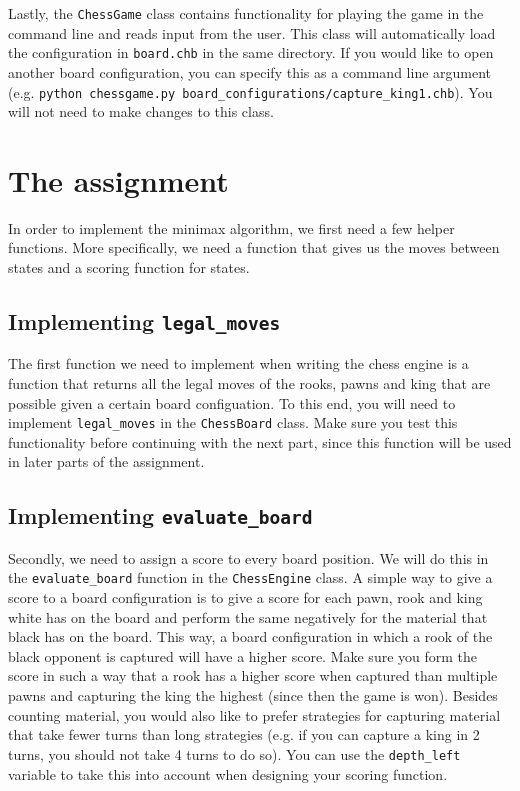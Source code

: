 \documentclass{article}
\begin{document}
Lastly, the \texttt{ChessGame} class contains functionality for playing the game in the command line and reads input from the user. This class will automatically load the configuration in \texttt{board.chb} in the same directory. If you would like to open another board configuration, you can specify this as a command line argument (e.g. \texttt{python chessgame.py board\_configurations/capture\_king1.chb}). You will not need to make changes to this class.


\section*{The assignment}
In order to implement the minimax algorithm, we first need a few helper functions. More specifically, we need a function that gives us the moves between states and a scoring function for states.

\subsection{Implementing \texttt{legal\_moves}}
The first function we need to implement when writing the chess engine is a function that returns all the legal moves of the rooks, pawns and king that are possible given a certain board configuation. To this end, you will need to implement \texttt{legal\_moves} in the \texttt{ChessBoard} class. Make sure you test this functionality before continuing with the next part, since this function will be used in later parts of the assignment.

\subsection{Implementing \texttt{evaluate\_board}}
Secondly, we need to assign a score to every board position. We will do this in the \texttt{evaluate\_board} function in the \texttt{ChessEngine} class. A simple way to give a score to a board configuration is to give a score for each pawn, rook and king white has on the board and perform the same negatively for the material that black has on the board. This way, a board configuration in which a rook of the black opponent is captured will have a higher score. Make sure you form the score in such a way that a rook has a higher score when captured than multiple pawns and capturing the king the highest (since then the game is won).
Besides counting material, you would also like to prefer strategies for capturing material that take fewer turns than long strategies (e.g. if you can capture a king in 2 turns, you should not take 4 turns to do so). You can use the \texttt{depth\_left} variable to take this into account when designing your scoring function.
\end{document}
